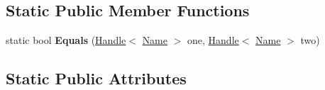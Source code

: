 \subsection*{Static Public Member Functions}
\begin{DoxyCompactItemize}
\item 
\hypertarget{classv8_1_1internal_1_1_name_a50a1ebb483d256a988a47585ee620b2e}{}static bool {\bfseries Equals} (\hyperlink{classv8_1_1internal_1_1_handle}{Handle}$<$ \hyperlink{classv8_1_1internal_1_1_name}{Name} $>$ one, \hyperlink{classv8_1_1internal_1_1_handle}{Handle}$<$ \hyperlink{classv8_1_1internal_1_1_name}{Name} $>$ two)\label{classv8_1_1internal_1_1_name_a50a1ebb483d256a988a47585ee620b2e}

\end{DoxyCompactItemize}
\subsection*{Static Public Attributes}
